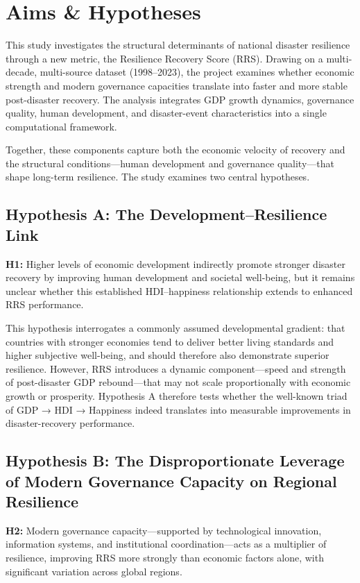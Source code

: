 \documentclass[conference]{IEEEtran}
\begin{document}
\section*{Aims \& Hypotheses}

This study investigates the structural determinants of national disaster resilience through a new metric, the Resilience Recovery Score (RRS). Drawing on a multi-decade, multi-source dataset (1998–2023), the project examines whether economic strength and modern governance capacities translate into faster and more stable post-disaster recovery. The analysis integrates GDP growth dynamics, governance quality, human development, and disaster-event characteristics into a single computational framework.

Together, these components capture both the economic velocity of recovery and the structural conditions—human development and governance quality—that shape long-term resilience. The study examines two central hypotheses.

\subsection*{Hypothesis A: The Development–Resilience Link}
\textbf{H1:} Higher levels of economic development indirectly promote stronger disaster recovery by improving human development and societal well-being, but it remains unclear whether this established HDI–happiness relationship extends to enhanced RRS performance.

This hypothesis interrogates a commonly assumed developmental gradient: that countries with stronger economies tend to deliver better living standards and higher subjective well-being, and should therefore also demonstrate superior resilience. However, RRS introduces a dynamic component—speed and strength of post-disaster GDP rebound—that may not scale proportionally with economic growth or prosperity. Hypothesis A therefore tests whether the well-known triad of GDP → HDI → Happiness indeed translates into measurable improvements in disaster-recovery performance.

\subsection*{Hypothesis B: The Disproportionate Leverage of Modern Governance Capacity on Regional Resilience}
\textbf{H2:} Modern governance capacity—supported by technological innovation, information systems, and institutional coordination—acts as a multiplier of resilience, improving RRS more strongly than economic factors alone, with significant variation across global regions.
\end{document}
